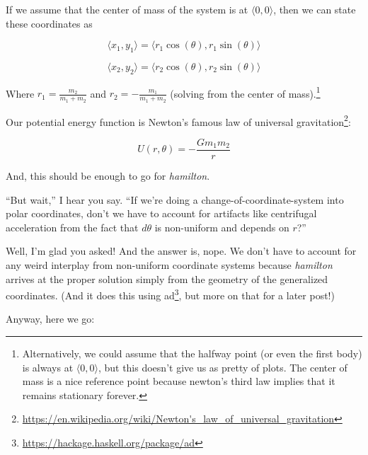 \documentclass[]{article}
\renewcommand{\href}[2]{#2\footnote{\url{#1}}}
\begin{document}
If we assume that the center of mass of the system is at \(\langle 0, 0
\rangle\), then we can state these coordinates as

\[
\langle x_1, y_1 \rangle = \langle r_1 \cos (\theta), r_1 \sin (\theta) \rangle
\]

\[
\langle x_2, y_2 \rangle = \langle r_2 \cos (\theta), r_2 \sin (\theta) \rangle
\]

Where \(r_1 = \frac{m_2}{m_1 + m_2}\) and \(r_2 = - \frac{m_1}{m_1 + m_2}\)
(solving from the center of mass).\footnote{Alternatively, we could assume that
  the halfway point (or even the first body) is always at
  \(\langle 0, 0 \rangle\), but this doesn't give us as pretty of plots. The
  center of mass is a nice reference point because newton's third law implies
  that it remains stationary forever.}

Our potential energy function is Newton's famous
\href{https://en.wikipedia.org/wiki/Newton's_law_of_universal_gravitation}{law
of universal gravitation}:

\[
U(r, \theta) = - \frac{G m_1 m_2}{r}
\]

And, this should be enough to go for \emph{hamilton}.

``But wait,'' I hear you say. ``If we're doing a change-of-coordinate-system
into polar coordinates, don't we have to account for artifacts like centrifugal
acceleration from the fact that \(d \theta\) is non-uniform and depends on
\(r\)?''

Well, I'm glad you asked! And the answer is, nope. We don't have to account for
any weird interplay from non-uniform coordinate systems because \emph{hamilton}
arrives at the proper solution simply from the geometry of the generalized
coordinates. (And it does this using
\href{https://hackage.haskell.org/package/ad}{ad}, but more on that for a later
post!)

Anyway, here we go:
\end{document}
